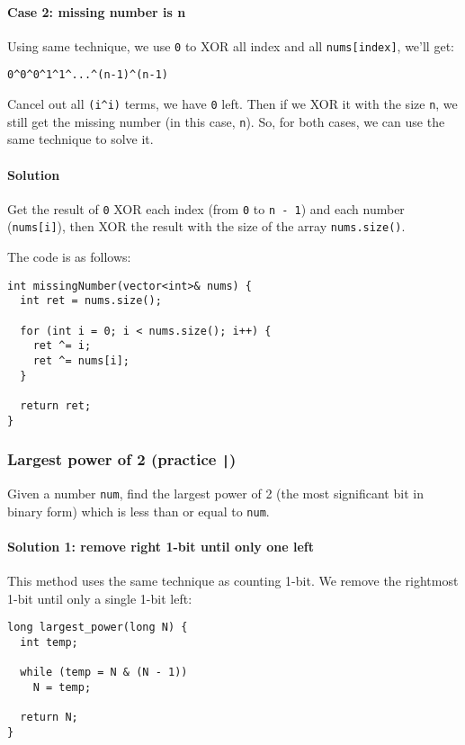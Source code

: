 \documentclass[12pt]{article}
\begin{document}
\paragraph{Case 2: missing number is n}
\label{sec:orgd77dc42}
Using same technique, we use \texttt{0} to XOR all index and all \texttt{nums[index]}, we'll get:
\begin{verbatim}
0^0^0^1^1^...^(n-1)^(n-1)
\end{verbatim}
Cancel out all \texttt{(i\textasciicircum{}i)} terms, we have \texttt{0} left. Then if we XOR it with the size \texttt{n}, we still get the missing number (in this case, \texttt{n}). So, for both cases, we can use the same technique to solve it.
\paragraph{Solution}
\label{sec:org24f3658}
Get the result of \texttt{0} XOR each index (from \texttt{0} to \texttt{n - 1}) and each number (\texttt{nums[i]}), then XOR the result with the size of the array \texttt{nums.size()}.

The code is as follows:
\begin{verbatim}
int missingNumber(vector<int>& nums) {
  int ret = nums.size();

  for (int i = 0; i < nums.size(); i++) {
    ret ^= i;
    ret ^= nums[i];
  }

  return ret;
}

\end{verbatim}
\subsubsection{Largest power of 2 (practice \texttt{|})}
\label{sec:org64cc3fc}
Given a number \texttt{num}, find the largest power of 2 (the most significant bit in binary form) which is less than or equal to \texttt{num}.
\paragraph{Solution 1: remove right 1-bit until only one left}
\label{sec:orga54da3a}
This method uses the same technique as counting 1-bit. We remove the rightmost 1-bit until only a single 1-bit left:
\begin{verbatim}
long largest_power(long N) {
  int temp;

  while (temp = N & (N - 1))
    N = temp;

  return N;
}
\end{verbatim}
\end{document}
